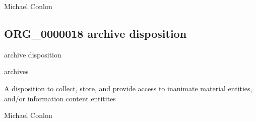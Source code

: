 \documentclass[letterpaper,10pt,english]{sphinxmanual}
\begin{document}
\begin{sphinxShadowBox}

\sphinxAtStartPar
Michael Conlon 
\end{sphinxShadowBox}
\begin{quote}

\ignorespaces \end{quote}


\subsection{ORG\_0000018 \sphinxhyphen{} archive disposition}
\label{\detokenize{doc-ORG_0000018:org-0000018-archive-disposition}}\label{\detokenize{doc-ORG_0000018:index-0}}\label{\detokenize{doc-ORG_0000018::doc}}
\begin{sphinxShadowBox}

\sphinxAtStartPar
archive disposition
\end{sphinxShadowBox}

\begin{sphinxShadowBox}

\sphinxAtStartPar
archives
\end{sphinxShadowBox}

\begin{sphinxShadowBox}

\sphinxAtStartPar
{\hyperref[\detokenize{doc-BFO_0000016::doc}]{}}
\end{sphinxShadowBox}

\begin{sphinxShadowBox}

\sphinxAtStartPar
A disposition to collect, store, and provide access to inanimate material entities, and/or information content entitites
\end{sphinxShadowBox}

\begin{sphinxShadowBox}

\sphinxAtStartPar
Michael Conlon 
\end{sphinxShadowBox}
\end{document}
